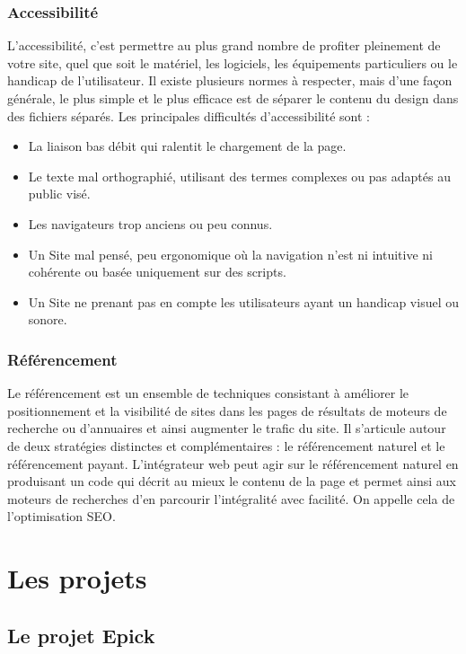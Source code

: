 \documentclass[a4paper, 12pt]{report}
\begin{document}
\subsection{Accessibilité}
L’accessibilité, c’est permettre au plus grand nombre de profiter pleinement de votre site, quel que soit le matériel, les logiciels, les équipements particuliers ou le handicap de l’utilisateur. Il existe plusieurs normes à respecter, mais d’une façon générale, le plus simple et le plus efficace est de séparer le contenu du design dans des fichiers séparés. Les principales difficultés d’accessibilité sont : 
\begin{itemize}
\item La liaison bas débit qui ralentit le chargement de la page.
\item Le texte mal orthographié, utilisant des termes complexes ou pas adaptés au public visé.
\item Les navigateurs trop anciens ou peu connus. 
\item Un Site mal pensé, peu ergonomique où la navigation n’est ni intuitive ni cohérente ou basée uniquement sur des scripts.
\item Un Site ne prenant pas en compte les utilisateurs ayant un handicap visuel ou sonore. 
\end{itemize} 
\subsection{Référencement}
Le référencement est un ensemble de techniques consistant à améliorer le positionnement et la visibilité de sites dans les pages de résultats de moteurs de recherche ou d’annuaires et ainsi augmenter le trafic du site. Il s’articule autour de deux stratégies distinctes et complémentaires : le référencement naturel et le référencement payant. L’intégrateur web peut agir sur le référencement naturel en produisant un code qui décrit au mieux le contenu de la page et permet ainsi aux moteurs de recherches d’en parcourir l’intégralité avec facilité. On appelle cela de l’optimisation SEO. 
\pagebreak
\chapter{Les projets}
\section{Le projet Epick}
\end{document}
